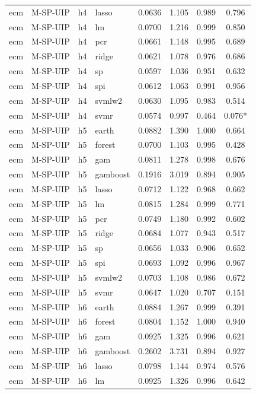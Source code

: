 \begin{ThreePartTable}
\begin{longtable}[t]{llclcccc}
ecm & M-SP-UIP & h4 & lasso & 0.0636 & 1.105 & 0.989 & 0.796\\
ecm & M-SP-UIP & h4 & lm & 0.0700 & 1.216 & 0.999 & 0.850\\
ecm & M-SP-UIP & h4 & pcr & 0.0661 & 1.148 & 0.995 & 0.689\\
ecm & M-SP-UIP & h4 & ridge & 0.0621 & 1.078 & 0.976 & 0.686\\
ecm & M-SP-UIP & h4 & sp & 0.0597 & 1.036 & 0.951 & 0.632\\
ecm & M-SP-UIP & h4 & spi & 0.0612 & 1.063 & 0.991 & 0.956\\
ecm & M-SP-UIP & h4 & svmlw2 & 0.0630 & 1.095 & 0.983 & 0.514\\
ecm & M-SP-UIP & h4 & svmr & 0.0574 & 0.997 & 0.464 & 0.076*\\
\addlinespace
ecm & M-SP-UIP & h5 & earth & 0.0882 & 1.390 & 1.000 & 0.664\\
ecm & M-SP-UIP & h5 & forest & 0.0700 & 1.103 & 0.995 & 0.428\\
ecm & M-SP-UIP & h5 & gam & 0.0811 & 1.278 & 0.998 & 0.676\\
ecm & M-SP-UIP & h5 & gamboost & 0.1916 & 3.019 & 0.894 & 0.905\\
ecm & M-SP-UIP & h5 & lasso & 0.0712 & 1.122 & 0.968 & 0.662\\
ecm & M-SP-UIP & h5 & lm & 0.0815 & 1.284 & 0.999 & 0.771\\
ecm & M-SP-UIP & h5 & pcr & 0.0749 & 1.180 & 0.992 & 0.602\\
ecm & M-SP-UIP & h5 & ridge & 0.0684 & 1.077 & 0.943 & 0.517\\
ecm & M-SP-UIP & h5 & sp & 0.0656 & 1.033 & 0.906 & 0.652\\
ecm & M-SP-UIP & h5 & spi & 0.0693 & 1.092 & 0.996 & 0.967\\
ecm & M-SP-UIP & h5 & svmlw2 & 0.0703 & 1.108 & 0.986 & 0.672\\
ecm & M-SP-UIP & h5 & svmr & 0.0647 & 1.020 & 0.707 & 0.151\\
\addlinespace
ecm & M-SP-UIP & h6 & earth & 0.0884 & 1.267 & 0.999 & 0.391\\
ecm & M-SP-UIP & h6 & forest & 0.0804 & 1.152 & 1.000 & 0.940\\
ecm & M-SP-UIP & h6 & gam & 0.0925 & 1.325 & 0.996 & 0.621\\
ecm & M-SP-UIP & h6 & gamboost & 0.2602 & 3.731 & 0.894 & 0.927\\
ecm & M-SP-UIP & h6 & lasso & 0.0798 & 1.144 & 0.974 & 0.576\\
ecm & M-SP-UIP & h6 & lm & 0.0925 & 1.326 & 0.996 & 0.642\\

\end{longtable}
\end{ThreePartTable}

